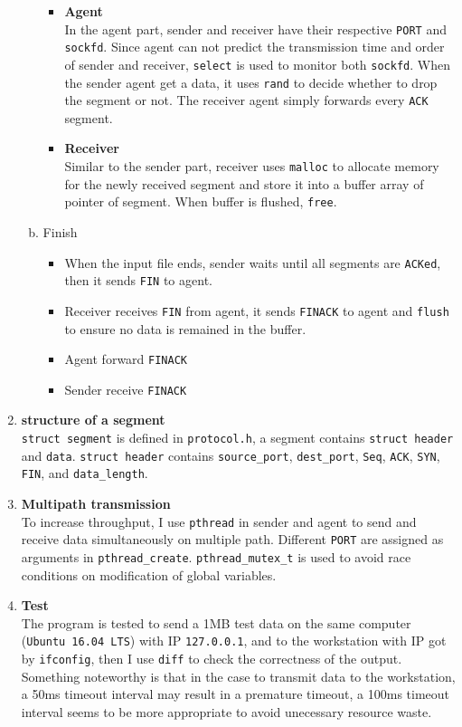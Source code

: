 \documentclass[12pt, a4paper]{article}
\begin{document}
\begin{enumerate}
\begin{enumerate}[(a)]
\begin{itemize}
\item \textbf{Agent} \\
In the agent part, sender and receiver have their respective \texttt{PORT} and \texttt{sockfd}. Since agent can not predict the transmission time and order of sender and receiver, \texttt{select} is used to monitor both \texttt{sockfd}. When the sender agent get a data, it uses \texttt{rand} to decide whether to drop the segment or not. The receiver agent simply forwards every \texttt{ACK} segment.
\item \textbf{Receiver} \\
Similar to the sender part, receiver uses \texttt{malloc} to allocate memory for the newly received segment and store it into a buffer array of pointer of segment. When buffer is flushed, \texttt{free}.
\end{itemize}
\item Finish
\begin{itemize}
\item When the input file ends, sender waits until all segments are \texttt{ACKed}, then it sends \texttt{FIN} to agent. 
\item Receiver receives \texttt{FIN} from agent, it sends \texttt{FINACK} to agent and \texttt{flush} to ensure no data is remained in the buffer. 
\item Agent forward \texttt{FINACK}
\item Sender receive \texttt{FINACK}
\end{itemize}
\end{enumerate}

\item \textbf{structure of a segment} \\
\texttt{struct segment} is defined in \texttt{protocol.h}, a segment contains \texttt{struct header} and \texttt{data}.
\texttt{struct header} contains \texttt{source\_port}, \texttt{dest\_port}, \texttt{Seq}, \texttt{ACK}, \texttt{SYN}, \texttt{FIN}, and \texttt{data\_length}.

\item \textbf{Multipath transmission} \\
To increase throughput, I use \texttt{pthread} in sender and agent to send and receive data simultaneously on multiple path. Different \texttt{PORT} are assigned as arguments in \texttt{pthread\_create}. \texttt{pthread\_mutex\_t} is used to avoid race conditions on modification of global variables.

\item \textbf{Test} \\
The program is tested to send a 1MB test data on the same computer (\texttt{Ubuntu 16.04 LTS}) with IP \texttt{127.0.0.1}, and to the workstation with IP got by \texttt{ifconfig}, then I use \texttt{diff} to check the correctness of the output. Something noteworthy is that in the case to transmit data to the workstation, a 50ms timeout interval may result in a premature timeout, a 100ms timeout interval seems to be more appropriate to avoid unecessary resource waste. 
\end{enumerate}
\end{document}
